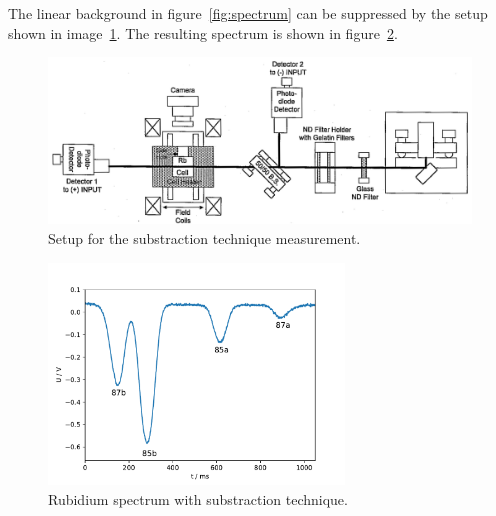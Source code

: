 The linear background in figure~\ref{fig:spectrum} can be suppressed by the
setup shown in image~\ref{fig:setup_substraction}.
The resulting spectrum is shown in figure~\ref{fig:spectrum_sub}.

\begin{figure}
  \centering
  \includegraphics[width=\textwidth]{Pics/setup_substraction.png}
  \caption{Setup for the substraction technique measurement.\cite{anleitung}}
  \label{fig:setup_substraction}
\end{figure}


\begin{figure}
  \centering
  \includegraphics[width=0.7\textwidth]{Pics/Rb_spectrum_subst.pdf}
  \caption{Rubidium spectrum with substraction technique.}
  \label{fig:spectrum_sub}
\end{figure}
